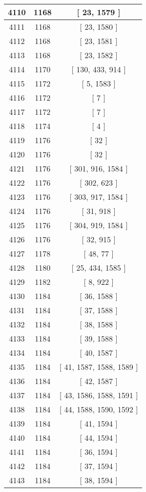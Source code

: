 \begin{center}
\begin{longtable}[H]{|| c c c ||}
4110 & 1168 & [ 23, 1579 ] \\ 
\hline
4111 & 1168 & [ 23, 1580 ] \\ 
\hline
4112 & 1168 & [ 23, 1581 ] \\ 
\hline
4113 & 1168 & [ 23, 1582 ] \\ 
\hline
4114 & 1170 & [ 130, 433, 914 ] \\ 
\hline
4115 & 1172 & [ 5, 1583 ] \\ 
\hline
4116 & 1172 & [ 7 ] \\ 
\hline
4117 & 1172 & [ 7 ] \\ 
\hline
4118 & 1174 & [ 4 ] \\ 
\hline
4119 & 1176 & [ 32 ] \\ 
\hline
4120 & 1176 & [ 32 ] \\ 
\hline
4121 & 1176 & [ 301, 916, 1584 ] \\ 
\hline
4122 & 1176 & [ 302, 623 ] \\ 
\hline
4123 & 1176 & [ 303, 917, 1584 ] \\ 
\hline
4124 & 1176 & [ 31, 918 ] \\ 
\hline
4125 & 1176 & [ 304, 919, 1584 ] \\ 
\hline
4126 & 1176 & [ 32, 915 ] \\ 
\hline
4127 & 1178 & [ 48, 77 ] \\ 
\hline
4128 & 1180 & [ 25, 434, 1585 ] \\ 
\hline
4129 & 1182 & [ 8, 922 ] \\ 
\hline
4130 & 1184 & [ 36, 1588 ] \\ 
\hline
4131 & 1184 & [ 37, 1588 ] \\ 
\hline
4132 & 1184 & [ 38, 1588 ] \\ 
\hline
4133 & 1184 & [ 39, 1588 ] \\ 
\hline
4134 & 1184 & [ 40, 1587 ] \\ 
\hline
4135 & 1184 & [ 41, 1587, 1588, 1589 ] \\ 
\hline
4136 & 1184 & [ 42, 1587 ] \\ 
\hline
4137 & 1184 & [ 43, 1586, 1588, 1591 ] \\ 
\hline
4138 & 1184 & [ 44, 1588, 1590, 1592 ] \\ 
\hline
4139 & 1184 & [ 41, 1594 ] \\ 
\hline
4140 & 1184 & [ 44, 1594 ] \\ 
\hline
4141 & 1184 & [ 36, 1594 ] \\ 
\hline
4142 & 1184 & [ 37, 1594 ] \\ 
\hline
4143 & 1184 & [ 38, 1594 ] \\ 

\end{longtable}
\end{center}
